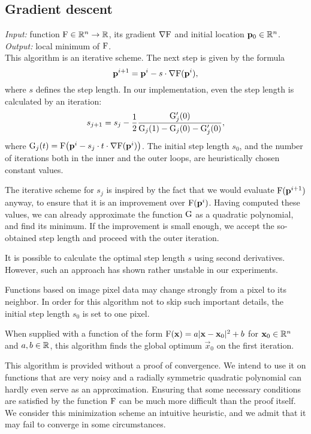 \subsection{Gradient descent}
\textit{Input:} function $\mathrm{F} \in \mathbb{R}^n \to \mathbb{R}$, its gradient $\nabla \mathrm{F}$ and initial location $\mathbf{p}_0 \in \mathbb{R}^n$.\\
\textit{Output:} local minimum of $\mathrm{F}$.\\

This algorithm is an iterative scheme.
The next step is given by the formula
$$\mathbf{p}^{i+1} = \mathbf{p}^i - s \cdot \nabla \mathrm{F}(\mathbf{p}^i),$$
where $s$ defines the step length.
In our implementation, even the step length is calculated by an iteration:
$$s_{j+1} = s_j - \frac 1 2 \frac {\mathrm{G}_j'(0)} {\mathrm{G}_j(1) - \mathrm{G}_j(0) - \mathrm{G}_j'(0)},$$
where $\mathrm{G}_j(t) = \mathrm{F} \big( \mathbf{p}^i - s_j \cdot t \cdot \nabla \mathrm{F}(\mathbf{p}^i) \big)$.
The initial step length $s_0$, and the number of iterations both in the inner and the outer loops, are heuristically chosen constant values.

The iterative scheme for $s_j$ is inspired by the fact that we would evaluate $\mathrm{F}(\mathbf{p}^{i+1})$ anyway, to ensure that it is an improvement over $\mathrm{F}(\mathbf{p}^i)$.
Having computed these values, we can already approximate the function $\mathrm{G}$ as a quadratic polynomial, and find its minimum.
If the improvement is small enough, we accept the so-obtained step length and proceed with the outer iteration.

It is possible to calculate the optimal step length $s$ using second derivatives.
However, such an approach has shown rather unstable in our experiments.

Functions based on image pixel data may change strongly from a pixel to its neighbor.
In order for this algorithm not to skip such important details, the initial step length $s_0$ is set to one pixel.

\begin{claim}
When supplied with a function of the form $\mathrm{F}(\mathbf{x}) = a|\mathbf{x} - \mathbf{x}_0|^2 + b$ for $\mathbf{x}_0 \in \mathbb{R}^n$ and $a, b \in \mathbb{R}$, this algorithm finds the global optimum $\vec x_0$ on the first iteration.
\end{claim}
This algorithm is provided without a proof of convergence.
We intend to use it on functions that are very noisy and a radially symmetric quadratic polynomial can hardly even serve as an approximation.
Ensuring that some necessary conditions are satisfied by the function $\mathrm{F}$ can be much more difficult than the proof itself.
We consider this minimization scheme an intuitive heuristic, and we admit that it may fail to converge in some circumstances.

